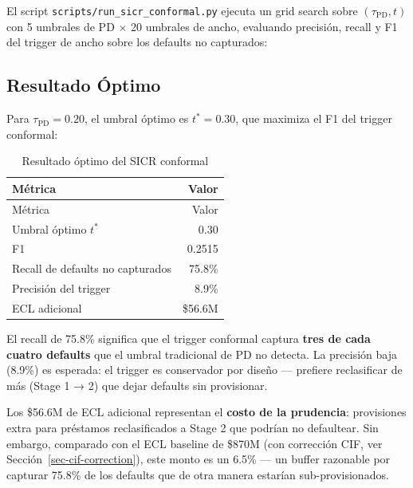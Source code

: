 \documentclass[
  spanish,
  11pt,
  letterpaper,
]{scrbook}
\theoremstyle{plain}
\theoremstyle{remark}
\begin{document}
El script \texttt{scripts/run\_sicr\_conformal.py} ejecuta un grid
search sobre \((\tau_{\text{PD}}, t)\) con 5 umbrales de PD \(\times\)
20 umbrales de ancho, evaluando precisión, recall y F1 del trigger de
ancho sobre los defaults no capturados:

\subsection{Resultado Óptimo}\label{resultado-uxf3ptimo}

Para \(\tau_{\text{PD}} = 0.20\), el umbral óptimo es \(t^* = 0.30\),
que maximiza el F1 del trigger conformal:

\begin{longtable}[]{@{}lr@{}}
\caption{Resultado óptimo del SICR
conformal}\label{tbl-sicr-optimal}\tabularnewline
\toprule\noalign{}
Métrica & Valor \\
\midrule\noalign{}
\endfirsthead
\toprule\noalign{}
Métrica & Valor \\
\midrule\noalign{}
\endhead
\bottomrule\noalign{}
\endlastfoot
Umbral óptimo \(t^*\) & 0.30 \\
F1 & 0.2515 \\
Recall de defaults no capturados & 75.8\% \\
Precisión del trigger & 8.9\% \\
ECL adicional & \$56.6M \\
\end{longtable}

El recall de 75.8\% significa que el trigger conformal captura
\textbf{tres de cada cuatro defaults} que el umbral tradicional de PD no
detecta. La precisión baja (8.9\%) es esperada: el trigger es
conservador por diseño --- prefiere reclasificar de más (Stage 1 → 2)
que dejar defaults sin provisionar.

\begin{tcolorbox}[enhanced jigsaw, arc=.35mm, bottomrule=.15mm, bottomtitle=1mm, breakable, colback=white, colbacktitle=quarto-callout-warning-color!10!white, colframe=quarto-callout-warning-color-frame, coltitle=black, left=2mm, leftrule=.75mm, opacityback=0, opacitybacktitle=0.6, rightrule=.15mm, title=\textcolor{quarto-callout-warning-color}{\faExclamationTriangle}\hspace{0.5em}{Trade-off Precisión vs Costo}, titlerule=0mm, toprule=.15mm, toptitle=1mm]

Los \$56.6M de ECL adicional representan el \textbf{costo de la
prudencia}: provisiones extra para préstamos reclasificados a Stage 2
que podrían no defaultear. Sin embargo, comparado con el ECL baseline de
\$870M (con corrección CIF, ver Sección~\ref{sec-cif-correction}), este
monto es un 6.5\% --- un buffer razonable por capturar 75.8\% de los
defaults que de otra manera estarían sub-provisionados.

\end{tcolorbox}
\end{document}

